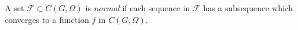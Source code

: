 A set $\mathcal{F} \subset C(G, \Omega)$ is \textit{normal} if each sequence in $\mathcal{F}$ has a subsequence which converges to a function $f$ in $C(G, \Omega)$.
